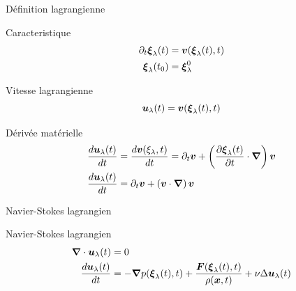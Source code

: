 \begin{frame}[<+->]{Définition lagrangienne}
 \begin{block}{Caracteristique}
\begin{align*}
 \partial_t {\boldsymbol {\xi}}_{\lambda}(t)&={\boldsymbol {v}}({\boldsymbol {\xi}}_{\lambda}(t),t)\\
 {\boldsymbol {\xi}}_{\lambda}(t_0)&={\boldsymbol {\xi}}^{0}_{\lambda}
\end{align*}
\end{block}

\begin{block}{Vitesse lagrangienne}
\begin{equation*}
 {\boldsymbol {u}}_{\lambda}(t)={\boldsymbol {v}}({\boldsymbol {\xi}}_{\lambda}(t),t)
\end{equation*}
\end{block}

\begin{block}{Dérivée matérielle}
\begin{align*}
\frac{d {\boldsymbol {u}}_{\lambda}(t)}{d t}&=\frac{d {\boldsymbol {v}}(\xi_{\lambda},t)}{d t}=\partial_t {\boldsymbol {v}}+\left(\frac{\partial {\boldsymbol {\xi}}_{\lambda}(t)}{\partial t}\cdot{\boldsymbol {\nabla}}\right){\boldsymbol {v}}\\
\frac{d {\boldsymbol {u}}_{\lambda}(t)}{d t}&=\partial_t {\boldsymbol {v}}+\left({\boldsymbol {v}} \cdot{\boldsymbol {\nabla}}\right){\boldsymbol {v}}
\end{align*}
 \end{block}

\end{frame}
\begin{frame}{Navier-Stokes lagrangien}
 \begin{block}{Navier-Stokes lagrangien}
 \begin{align*}
{\boldsymbol {\nabla}} \cdot {\boldsymbol {u}}_{\lambda}(t)&=0\\
\frac{d {\boldsymbol {u}}_{\lambda}(t)}{d t}&=-{\boldsymbol {\nabla}} p({\boldsymbol {\xi}}_{\lambda}(t),t)+\frac{{\boldsymbol {F}}({\boldsymbol {\xi}}_{\lambda}(t),t)}{\rho({\boldsymbol {x}},t)}+\nu \Delta {\boldsymbol {u}}_{\lambda}(t)
 \end{align*}
 \end{block}

\end{frame}


